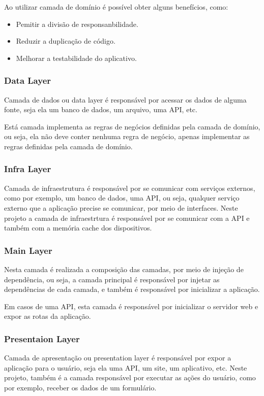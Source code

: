 \documentclass[12pt]{article}
\begin{document}
Ao utilizar camada de domínio é possível obter alguns benefícios, como:
\begin{itemize}
    \item Pemitir a divisão de responsanbilidade.
    \item Reduzir a duplicação de código.
    \item Melhorar a testabilidade do aplicativo.
\end{itemize}

\subsubsection{Data Layer}
\label{dataLayer}
Camada de dados ou data layer é responsável por acessar os dados de alguma fonte, seja ela um banco de dados, um arquivo, uma API, etc.

Está camada implementa as regras de negócios definidas pela camada de domínio, ou seja, ela não deve conter nenhuma regra de negócio, apenas implementar as regras definidas pela camada de domínio.

\subsubsection{Infra Layer}
\label{infraLayer}
Camada de infraestrutura é responsável por se comunicar com serviços externos, como por exemplo, um banco de dados, uma API, ou seja, qualquer serviço externo que a aplicação precise se comunicar, por meio de interfaces. Neste projeto a camada de infraestrtura é responsável por se comunicar com a API e também com a memória cache dos dispositivos.

\subsubsection{Main Layer}
\label{mainLayer}
Nesta camada é realizada a composição das camadas, por meio de injeção de dependência, ou seja, a camada principal é responsável por injetar as dependências de cada camada, e também é responsável por inicializar a aplicação. 

Em casos de uma API, esta camada é responsável por inicializar o servidor web e expor as rotas da aplicação.

\subsubsection{Presentaion Layer}
\label{presentantionLayer}
Camada de apresentação ou presentation layer é responsável por expor a aplicação para o usuário, seja ela uma API, um site, um aplicativo, etc. Neste projeto, também é a camada responsável por executar as ações do usuário, como por exemplo, receber os dados de um formulário. 
\end{document}
